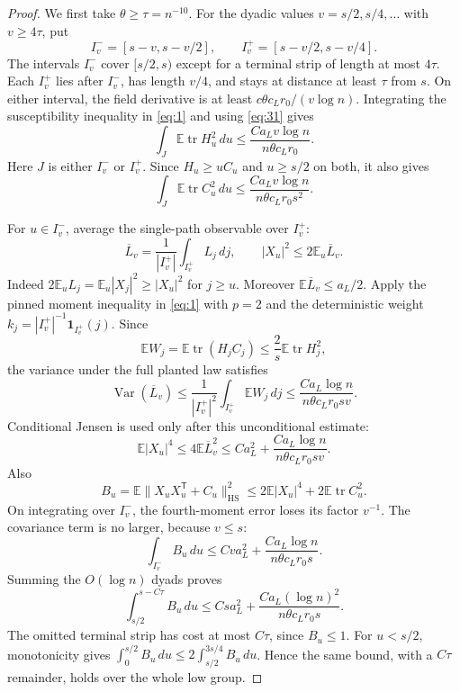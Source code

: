 \begin{proof}
We first take $\theta\ge\tau=n^{-10}$. For the dyadic values
$v=s/2,s/4,\ldots$ with $v\ge4\tau$, put
\[
 I_v^-=[s-v,s-v/2],\qquad I_v^+=[s-v/2,s-v/4].
\]
The intervals $I_v^-$ cover $[s/2,s)$ except for a terminal strip of
length at most $4\tau$. Each $I_v^+$ lies after $I_v^-$, has length
$v/4$, and stays at distance at least $\tau$ from $s$. On either
interval, the field derivative is at least
$c\theta c_Lr_0/(v\log n)$. Integrating the susceptibility
inequality in \eqref{eq:1} and using \eqref{eq:31} gives
\[
 \int_J\mathbb E\operatorname{tr}H_u^2\,du
          \le\frac{C a_Lv\log n}{n\theta c_Lr_0}.
\]
Here $J$ is either $I_v^-$ or $I_v^+$. Since $H_u\ge u C_u$ and
$u\ge s/2$ on both, it also gives
\[
 \int_J\mathbb E\operatorname{tr}C_u^2\,du
          \le\frac{C a_Lv\log n}{n\theta c_Lr_0s^2}.
\]

For $u\in I_v^-$, average the single-path observable over $I_v^+$:
\[
 \overline L_v=\frac1{|I_v^+|}\int_{I_v^+}L_j\,dj,\qquad
 |X_u|^2\le2\mathbb E_u\overline L_v.
\]
Indeed $2\mathbb E_u L_j=\mathbb E_u|X_j|^2\ge|X_u|^2$ for $j\ge u$.
Moreover $\mathbb E\overline L_v\le a_L/2$. Apply the pinned moment inequality
in \eqref{eq:1} with $p=2$ and the deterministic weight
$k_j=|I_v^+|^{-1}\mathbf1_{I_v^+}(j)$. Since
\[
 \mathbb E W_j=\mathbb E\operatorname{tr}(H_jC_j)
                    \le\frac2s\mathbb E\operatorname{tr}H_j^2,
\]
the variance under the full planted law satisfies
\[
 \operatorname{Var}(\overline L_v)
 \le\frac1{|I_v^+|^2}\int_{I_v^+}\mathbb E W_j\,dj
 \le\frac{C a_L\log n}{n\theta c_Lr_0sv}.
\]
Conditional Jensen is used only after this unconditional estimate:
\[
 \mathbb E|X_u|^4
 \le4\mathbb E\overline L_v^2
 \le C a_L^2+
             \frac{C a_L\log n}{n\theta c_Lr_0sv}.
\]
Also
\[
 B_u=\mathbb E\|X_uX_u^{\mathsf T}+C_u\|_{\mathrm{HS}}^2
 \le2\mathbb E|X_u|^4+2\mathbb E\operatorname{tr}C_u^2.
\]
On integrating over $I_v^-$, the fourth-moment error loses its factor
$v^{-1}$. The covariance term is no larger, because $v\le s$:
\[
 \int_{I_v^-}B_u\,du
 \le Cv a_L^2+
      \frac{C a_L\log n}{n\theta c_Lr_0s}.
\]
Summing the $O(\log n)$ dyads proves
\[
 \int_{s/2}^{s-C\tau}B_u\,du
 \le Csa_L^2+
                \frac{C a_L(\log n)^2}{n\theta c_Lr_0s}.
\]
The omitted terminal strip has cost at most $C\tau$, since $B_u\le1$.
For $u<s/2$, monotonicity gives
$\int_0^{s/2}B_u\,du\le2\int_{s/2}^{3s/4}B_u\,du$.
Hence the same bound, with a $C\tau$ remainder, holds over
the whole low group.


\end{proof}
